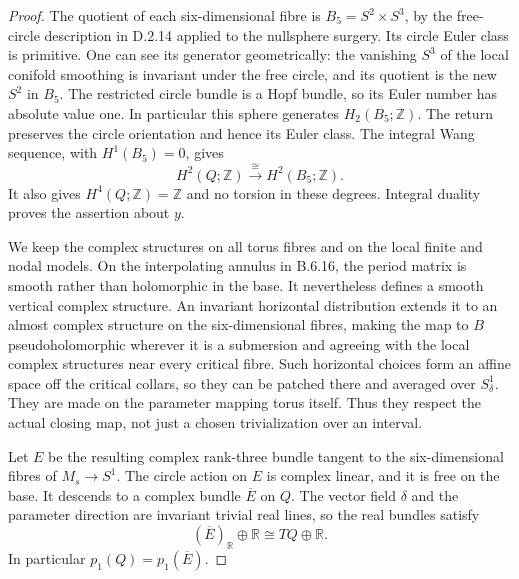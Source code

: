 \begin{proof}
The quotient of each six-dimensional fibre is
$B_5=S^2\times S^3$, by the free-circle description in
D.2.14 applied to the nullsphere surgery.  Its circle Euler
class is primitive.  One can see its generator geometrically:
the vanishing $S^3$ of the local conifold smoothing is
invariant under the free circle, and its quotient is the new
$S^2$ in $B_5$.  The restricted circle bundle is a Hopf bundle,
so its Euler number has absolute value one.  In particular
this sphere generates $H_2(B_5;\mathbb Z)$.
The return preserves the circle orientation and hence its
Euler class.  The integral Wang sequence, with
$H^1(B_5)=0$, gives
\[
 H^2(Q;\mathbb Z)\xrightarrow{\;\cong\;}H^2(B_5;\mathbb Z).
 \tag{B.Q3}
\]
It also gives $H^4(Q;\mathbb Z)=\mathbb Z$ and no torsion
in these degrees.  Integral duality proves the assertion
about $y$.

We keep the complex structures on all torus fibres and on
the local finite and nodal models.  On the interpolating
annulus in B.6.16, the period matrix is smooth rather than
holomorphic in the base.  It nevertheless defines a smooth
vertical complex structure.  An invariant horizontal
distribution extends it to an almost complex structure on
the six-dimensional fibres, making the map to $B$
pseudoholomorphic wherever it is a submersion and agreeing
with the local complex structures near every critical
fibre.  Such horizontal choices form an affine space off
the critical collars, so they can be patched there and
averaged over $S^1_\delta$.  They are made on the parameter
mapping torus itself.  Thus they respect the actual closing
map, not just a chosen trivialization over an interval.

Let $E$ be the resulting complex rank-three bundle tangent
to the six-dimensional fibres of $M_s\to S^1$.  The circle
action on $E$ is complex linear, and it is free on the base.
It descends to a complex bundle $\overline E$ on $Q$.
The vector field $\delta$ and the parameter direction are
invariant trivial real lines, so the real bundles satisfy
\[
 (\overline E)_{\mathbb R}\oplus\mathbb R
                         \cong TQ\oplus\mathbb R.
 \tag{B.Q4}
\]
In particular $p_1(Q)=p_1(\overline E)$.


\end{proof}
